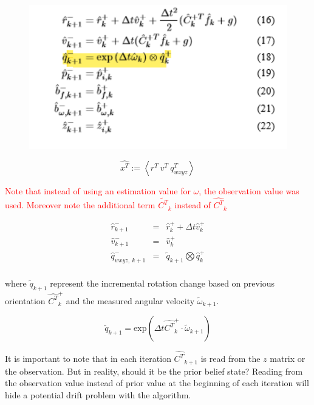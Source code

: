 \documentclass[letterpaper, 10 pt, conference]{ieeeconf}  %
\newcommand{\transpose}[1]{\ensuremath{#1^{\scriptscriptstyle T}}}
\begin{document}
\begin{figure}[h]
        \includegraphics[width=.45\textwidth]{fig01.png}
        \centering
      \end{figure}


\begin{equation}
  \hat{\transpose{x}} :=  \left<\transpose{r}~\transpose{v}~\transpose{q_{wxyz}} \right>
\end{equation}

\textcolor{red}{Note that instead of using an estimation value for \(\omega\), the observation
value was used. Moreover note the additional term \(\tilde{\transpose{C}}_{k} \) instead of
\(\hat{\transpose{C}}_{k} \)}

\begin{equation}
  \begin{array}{lll}
    \hat{r}_{k+1}^{-} &  = & \hat{r}^{+}_{k} + \Delta t \hat{v}^{+}_{k} \\
    \hat{v}_{k+1}^{-} &  = & \hat{v}^{+}_{k} \\
    \hat{q}_{wxyz,~k+1}^{-} &  = &  \tilde{q}_{k+1} \bigotimes \hat{q}_{k}^{+}\\
  \end{array}
\end{equation}

\noindent
where \(\tilde{q}_{k+1}\) represent the incremental rotation change based on
previous orientation \(\hat{\transpose{C}}_{k}^{+}\) and the measured angular velocity \(\tilde{\omega}_{k+1}\).


\begin{equation}
  \tilde{q}_{k+1} = \text{exp}\left(\Delta t  \hat{\transpose{C}}_{k}^{+} \cdot \tilde{\omega}_{k+1} \right)
\end{equation}


It is important to note that in each iteration \(\hat{\transpose{C}}_{k+1} \) is
read from the \(z\) matrix or the observation. But in reality, should it be the
prior belief state? Reading from the observation value instead of prior value at
the beginning of each iteration will hide a potential drift problem with the algorithm.

\end{document}
